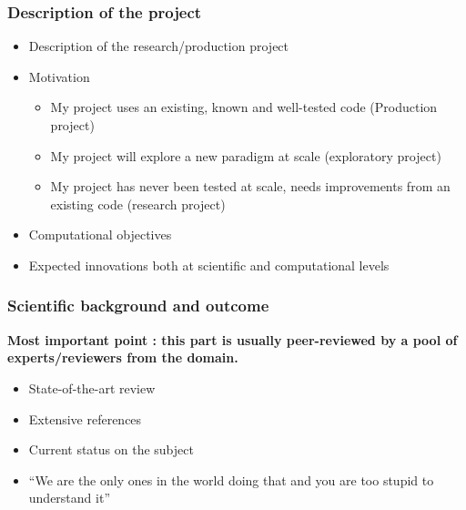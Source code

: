 \begin{frame}[containsverbatim]
	\frametitle{Description of the project}

\begin{itemize}
	\item{\textcolor{dkgreen}{Description of the research/production project} }
	\item{\textcolor{dkgreen}{Motivation}
		\begin{itemize}
			\item{My project uses an existing, known and well-tested code (Production project)}
			\item{My project will explore a new paradigm at scale (exploratory project)}
			\item{My project has never been tested at scale, needs improvements from an existing code (research project)}
		\end{itemize}
	}
	\item{\textcolor{dkgreen}{Computational objectives} }
	\item{\textcolor{dkgreen}{Expected innovations both at scientific and computational levels} }
\end{itemize}
\end{frame}


\begin{frame}[containsverbatim]
	\frametitle{Scientific background and outcome}
\textbf{Most important point : this part is usually peer-reviewed by a pool of experts/reviewers from the domain.}
\begin{itemize}
	\item{\textcolor{dkgreen}{State-of-the-art review} }
	\item{\textcolor{dkgreen}{Extensive references} }
	\item{\textcolor{dkgreen}{Current status on the subject}	} 
	\item{\textcolor{dkred}{``We are the only ones in the world doing that and you are too stupid to understand it''} }
\end{itemize}
\end{frame}



